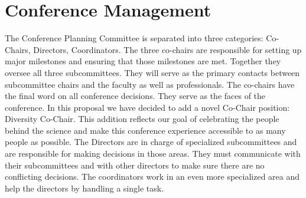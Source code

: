 \section{Conference Management}

The Conference Planning Committee is separated into three categories: Co-Chairs, Directors, Coordinators. The three co-chairs are responsible for setting up major milestones and ensuring that those milestones are met. Together they oversee all three subcommittees. They will serve as the primary contacts between subcommittee chairs and the faculty as well as professionals. The co-chairs have the final word on all conference decisions. They serve as the faces of the conference. In this proposal we have decided to add a novel Co-Chair position: Diversity Co-Chair. This addition reflects our goal of celebrating the people behind the science and make this conference experience accessible to as many people as possible.
The Directors are in charge of specialized subcommittees and are responsible for making decisions in those areas. They must communicate with their subcommittees and with other directors to make sure there are no conflicting decisions. The coordinators work in an even more specialized area and help the directors by handling a single task.\\


